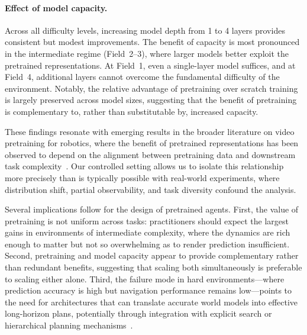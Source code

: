 \paragraph{Effect of model capacity.}
Across all difficulty levels, increasing model depth from 1 to 4 layers provides consistent but modest improvements. The benefit of capacity is most pronounced in the intermediate regime (Field~2--3), where larger models better exploit the pretrained representations. At Field~1, even a single-layer model suffices, and at Field~4, additional layers cannot overcome the fundamental difficulty of the environment. Notably, the relative advantage of pretraining over scratch training is largely preserved across model sizes, suggesting that the benefit of pretraining is complementary to, rather than substitutable by, increased capacity.



These findings resonate with emerging results in the broader literature on video pretraining for robotics, where the benefit of pretrained representations has been observed to depend on the alignment between pretraining data and downstream task complexity~\citep{wu2023unleashinglargescalevideogenerative, parisi2022unsurprisingeffectivenesspretrainedvision}. Our controlled setting allows us to isolate this relationship more precisely than is typically possible with real-world experiments, where distribution shift, partial observability, and task diversity confound the analysis.

Several implications follow for the design of pretrained agents. First, the value of pretraining is not uniform across tasks: practitioners should expect the largest gains in environments of intermediate complexity, where the dynamics are rich enough to matter but not so overwhelming as to render prediction insufficient. Second, pretraining and model capacity appear to provide complementary rather than redundant benefits, suggesting that scaling both simultaneously is preferable to scaling either alone. Third, the failure mode in hard environments---where prediction accuracy is high but navigation performance remains low---points to the need for architectures that can translate accurate world models into effective long-horizon plans, potentially through integration with explicit search or hierarchical planning mechanisms~\citep{hafner2020dreamcontrollearningbehaviors, hafner2025trainingagentsinsidescalable}.
